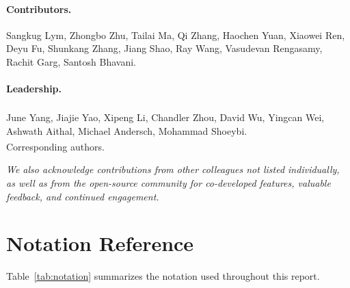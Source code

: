\paragraph{Contributors.}
Sangkug Lym, Zhongbo Zhu, Tailai Ma, Qi Zhang, Haochen Yuan, Xiaowei Ren, Deyu Fu, Shunkang Zhang, Jiang Shao, Ray Wang, Vasudevan Rengasamy, Rachit Garg, Santosh Bhavani.

\paragraph{Leadership.}
June Yang\textsuperscript{\dag}, Jiajie Yao\textsuperscript{\dag}, Xipeng Li, Chandler Zhou, David Wu, Yingcan Wei, Ashwath Aithal, Michael Andersch, Mohammad Shoeybi.\\
{\small \textsuperscript{\dag}Corresponding authors.}

\vspace{0.5em}
\noindent\textit{We also acknowledge contributions from other colleagues not listed individually, as well as from the open-source community for co-developed features, valuable feedback, and continued engagement.}




\newpage
\appendix

\section{Notation Reference}\label{sec:notation}

Table~\ref{tab:notation} summarizes the notation used throughout this report.


